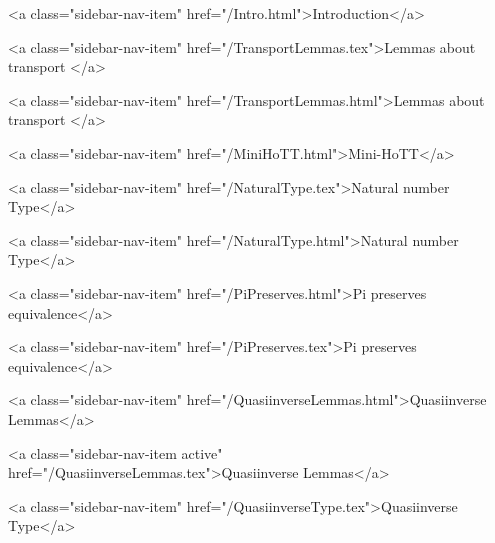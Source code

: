       
    
      
        
          <a class="sidebar-nav-item" href="/Intro.html">Introduction</a>
        
      
    
      
        
          <a class="sidebar-nav-item" href="/TransportLemmas.tex">Lemmas about transport </a>
        
      
    
      
        
          <a class="sidebar-nav-item" href="/TransportLemmas.html">Lemmas about transport </a>
        
      
    
      
        
          <a class="sidebar-nav-item" href="/MiniHoTT.html">Mini-HoTT</a>
        
      
    
      
        
          <a class="sidebar-nav-item" href="/NaturalType.tex">Natural number Type</a>
        
      
    
      
        
          <a class="sidebar-nav-item" href="/NaturalType.html">Natural number Type</a>
        
      
    
      
        
          <a class="sidebar-nav-item" href="/PiPreserves.html">Pi preserves equivalence</a>
        
      
    
      
        
          <a class="sidebar-nav-item" href="/PiPreserves.tex">Pi preserves equivalence</a>
        
      
    
      
        
          <a class="sidebar-nav-item" href="/QuasiinverseLemmas.html">Quasiinverse Lemmas</a>
        
      
    
      
        
          <a class="sidebar-nav-item active" href="/QuasiinverseLemmas.tex">Quasiinverse Lemmas</a>
        
      
    
      
        
          <a class="sidebar-nav-item" href="/QuasiinverseType.tex">Quasiinverse Type</a>
        
